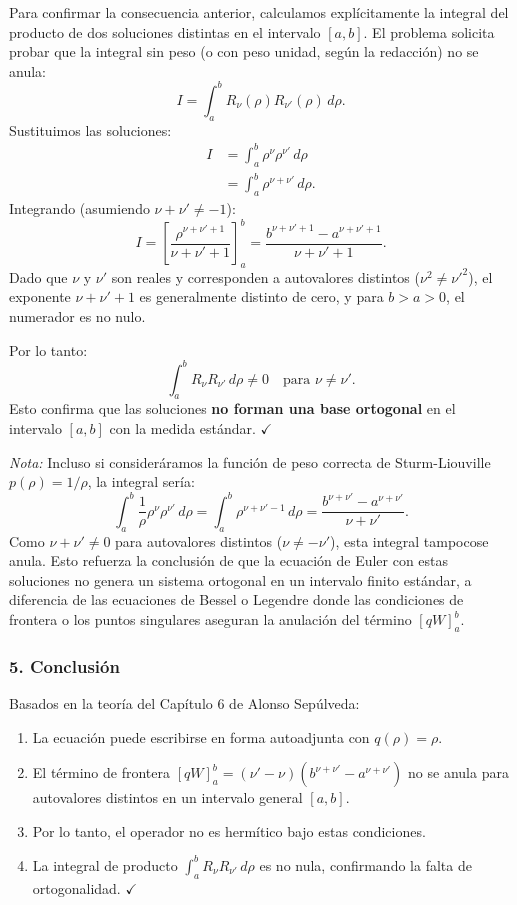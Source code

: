 \documentclass[a4paper]{article}
\begin{document}
Para confirmar la consecuencia anterior, calculamos explícitamente la integral del producto de dos soluciones distintas en el intervalo $[a, b]$. El problema solicita probar que la integral sin peso (o con peso unidad, según la redacción) no se anula:
$$
I = \int_a^b R_\nu(\rho) R_{\nu'}(\rho) \, d\rho.
$$
Sustituimos las soluciones:
\begin{align}
I &= \int_a^b \rho^\nu \rho^{\nu'} \, d\rho \nonumber \\
&= \int_a^b \rho^{\nu+\nu'} \, d\rho.
\end{align}
Integrando (asumiendo $\nu + \nu' \neq -1$):
$$
I = \left[ \frac{\rho^{\nu+\nu'+1}}{\nu+\nu'+1} \right]_a^b = \frac{b^{\nu+\nu'+1} - a^{\nu+\nu'+1}}{\nu+\nu'+1}.
$$
Dado que $\nu$ y $\nu'$ son reales y corresponden a autovalores distintos ($\nu^2 \neq \nu'^2$), el exponente $\nu+\nu'+1$ es generalmente distinto de cero, y para $b > a > 0$, el numerador es no nulo.

Por lo tanto:
$$
\int_a^b R_\nu R_{\nu'} \, d\rho \neq 0 \quad \text{para } \nu \neq \nu'.
$$
Esto confirma que las soluciones \textbf{no forman una base ortogonal} en el intervalo $[a, b]$ con la medida estándar. $\checkmark$

\textit{Nota:} Incluso si consideráramos la función de peso correcta de Sturm-Liouville $p(\rho) = 1/\rho$, la integral sería:
$$
\int_a^b \frac{1}{\rho} \rho^\nu \rho^{\nu'} \, d\rho = \int_a^b \rho^{\nu+\nu'-1} \, d\rho = \frac{b^{\nu+\nu'} - a^{\nu+\nu'}}{\nu+\nu'}.
$$
Como $\nu + \nu' \neq 0$ para autovalores distintos ($\nu \neq -\nu'$), esta integral tampocose anula. Esto refuerza la conclusión de que la ecuación de Euler con estas soluciones no genera un sistema ortogonal en un intervalo finito estándar, a diferencia de las ecuaciones de Bessel o Legendre donde las condiciones de frontera o los puntos singulares aseguran la anulación del término $[qW]_a^b$.

\subsubsection{5. Conclusión}

Basados en la teoría del Capítulo 6 de Alonso Sepúlveda:
\begin{enumerate}
    \item La ecuación puede escribirse en forma autoadjunta con $q(\rho) = \rho$.
    \item El término de frontera $[qW]_a^b = (\nu' - \nu)(b^{\nu+\nu'} - a^{\nu+\nu'})$ no se anula para autovalores distintos en un intervalo general $[a, b]$.
    \item Por lo tanto, el operador no es hermítico bajo estas condiciones.
    \item La integral de producto $\int_a^b R_\nu R_{\nu'} \, d\rho$ es no nula, confirmando la falta de ortogonalidad. $\checkmark$
\end{enumerate}
\end{document}
